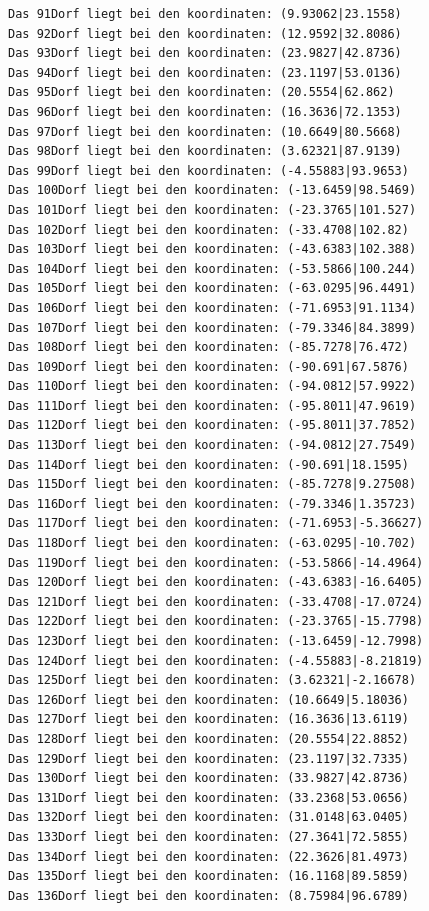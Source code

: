 \documentclass{article}
\begin{document}
\begin{verbatim}
Das 91Dorf liegt bei den koordinaten: (9.93062|23.1558)
Das 92Dorf liegt bei den koordinaten: (12.9592|32.8086)
Das 93Dorf liegt bei den koordinaten: (23.9827|42.8736)
Das 94Dorf liegt bei den koordinaten: (23.1197|53.0136)
Das 95Dorf liegt bei den koordinaten: (20.5554|62.862)
Das 96Dorf liegt bei den koordinaten: (16.3636|72.1353)
Das 97Dorf liegt bei den koordinaten: (10.6649|80.5668)
Das 98Dorf liegt bei den koordinaten: (3.62321|87.9139)
Das 99Dorf liegt bei den koordinaten: (-4.55883|93.9653)
Das 100Dorf liegt bei den koordinaten: (-13.6459|98.5469)
Das 101Dorf liegt bei den koordinaten: (-23.3765|101.527)
Das 102Dorf liegt bei den koordinaten: (-33.4708|102.82)
Das 103Dorf liegt bei den koordinaten: (-43.6383|102.388)
Das 104Dorf liegt bei den koordinaten: (-53.5866|100.244)
Das 105Dorf liegt bei den koordinaten: (-63.0295|96.4491)
Das 106Dorf liegt bei den koordinaten: (-71.6953|91.1134)
Das 107Dorf liegt bei den koordinaten: (-79.3346|84.3899)
Das 108Dorf liegt bei den koordinaten: (-85.7278|76.472)
Das 109Dorf liegt bei den koordinaten: (-90.691|67.5876)
Das 110Dorf liegt bei den koordinaten: (-94.0812|57.9922)
Das 111Dorf liegt bei den koordinaten: (-95.8011|47.9619)
Das 112Dorf liegt bei den koordinaten: (-95.8011|37.7852)
Das 113Dorf liegt bei den koordinaten: (-94.0812|27.7549)
Das 114Dorf liegt bei den koordinaten: (-90.691|18.1595)
Das 115Dorf liegt bei den koordinaten: (-85.7278|9.27508)
Das 116Dorf liegt bei den koordinaten: (-79.3346|1.35723)
Das 117Dorf liegt bei den koordinaten: (-71.6953|-5.36627)
Das 118Dorf liegt bei den koordinaten: (-63.0295|-10.702)
Das 119Dorf liegt bei den koordinaten: (-53.5866|-14.4964)
Das 120Dorf liegt bei den koordinaten: (-43.6383|-16.6405)
Das 121Dorf liegt bei den koordinaten: (-33.4708|-17.0724)
Das 122Dorf liegt bei den koordinaten: (-23.3765|-15.7798)
Das 123Dorf liegt bei den koordinaten: (-13.6459|-12.7998)
Das 124Dorf liegt bei den koordinaten: (-4.55883|-8.21819)
Das 125Dorf liegt bei den koordinaten: (3.62321|-2.16678)
Das 126Dorf liegt bei den koordinaten: (10.6649|5.18036)
Das 127Dorf liegt bei den koordinaten: (16.3636|13.6119)
Das 128Dorf liegt bei den koordinaten: (20.5554|22.8852)
Das 129Dorf liegt bei den koordinaten: (23.1197|32.7335)
Das 130Dorf liegt bei den koordinaten: (33.9827|42.8736)
Das 131Dorf liegt bei den koordinaten: (33.2368|53.0656)
Das 132Dorf liegt bei den koordinaten: (31.0148|63.0405)
Das 133Dorf liegt bei den koordinaten: (27.3641|72.5855)
Das 134Dorf liegt bei den koordinaten: (22.3626|81.4973)
Das 135Dorf liegt bei den koordinaten: (16.1168|89.5859)
Das 136Dorf liegt bei den koordinaten: (8.75984|96.6789)

\end{verbatim}
\end{document}
